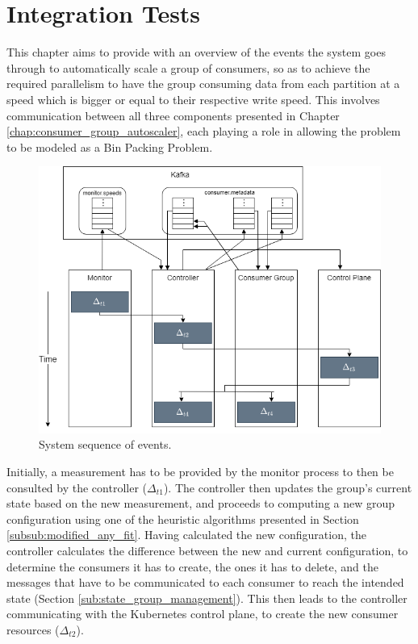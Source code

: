 \chapter{Integration Tests} 
\label{chap:integration_tests}

This chapter aims to provide with an overview of the events the system goes
through to automatically scale a group of consumers, so as to achieve the
required parallelism to have the group consuming data from each partition at a
speed which is bigger or equal to their respective write speed. This involves
communication between all three components presented in Chapter
\ref{chap:consumer_group_autoscaler}, each playing a role in allowing the
problem to be modeled as a Bin Packing Problem.

\begin{figure}[htb!]
\centering
\includegraphics[width=\textwidth]{images/integration/Integration_diagram.png}
\caption{System sequence of events.}
\label{fig:step_event_sequence}
\end{figure}

Initially, a measurement has to be provided by the monitor process to then be
consulted by the controller ($\Delta_{t1}$). The controller then updates the
group's current state based on the new measurement, and proceeds to computing a
new group configuration using one of the heuristic algorithms presented in
Section \ref{subsub:modified_any_fit}.  Having calculated the new configuration,
the controller calculates the difference between the new and current
configuration, to determine the consumers it has to create, the ones it has to
delete, and the messages that have to be communicated to each consumer to reach
the intended state (Section \ref{sub:state_group_management}). This then leads
to the controller communicating with the Kubernetes control plane, to create the
new consumer resources ($\Delta_{t2}$). 


